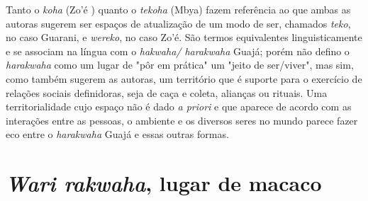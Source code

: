 Tanto o \emph{koha} (Zo'é ) quanto o \emph{tekoha} (Mbya) fazem
referência ao que ambas as autoras sugerem ser espaços de atualização de
um modo de ser, chamados \emph{teko}, no caso Guarani, e \emph{wereko},
no caso Zo'é. São termos equivalentes linguisticamente e se associam na
língua com o \emph{hakwaha/ harakwaha} Guajá; porém não defino o
\emph{harakwaha} como um lugar de "pôr em prática" um "jeito de
ser/viver", mas sim, como também sugerem as autoras, um território que é
suporte para o exercício de relações sociais definidoras, seja de caça e
coleta, alianças ou rituais. Uma territorialidade cujo espaço não é dado
\emph{a priori} e que aparece de acordo com as interações entre as
pessoas, o ambiente e os diversos seres no mundo parece fazer eco entre
o \emph{harakwaha} Guajá e essas outras formas.

\section{\emph{Wari rakwaha}, lugar de macaco}\label{wari-rakwaha-lugar-de-macaco}

